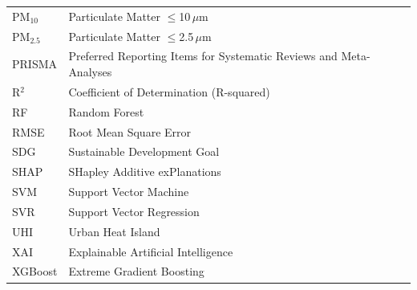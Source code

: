 \begin{tabular}{@{}ll}
PM$_{10}$ & Particulate Matter $\leq$10\,$\mu$m \\
PM$_{2.5}$ & Particulate Matter $\leq$2.5\,$\mu$m \\
PRISMA    & Preferred Reporting Items for Systematic Reviews and Meta-Analyses \\
R$^2$    & Coefficient of Determination (R-squared) \\
RF        & Random Forest \\
RMSE      & Root Mean Square Error \\
SDG       & Sustainable Development Goal \\
SHAP      & SHapley Additive exPlanations \\
SVM       & Support Vector Machine \\
SVR       & Support Vector Regression \\
UHI       & Urban Heat Island \\
XAI       & Explainable Artificial Intelligence \\
XGBoost   & Extreme Gradient Boosting \\
\end{tabular}